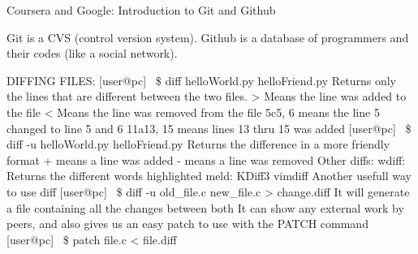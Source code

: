 \documentclass{article}
\begin{document}
Coursera and Google: Introduction to Git and Github

Git is a CVS (control version system).
Github is a database of programmers and their codes (like a social network).

DIFFING FILES:
[user@pc] ~\$ diff helloWorld.py helloFriend.py
	Returns only the lines that are different between the two files.
		> Means the line was added to the file
		< Means the line was removed from the file
		5c5, 6 means the line 5 changed to line 5 and 6
		11a13, 15 means lines 13 thru 15 was added
[user@pc] ~\$ diff -u helloWorld.py helloFriend.py
	Returns the difference in a more friendly format
		+ means a line was added
		- means a line was removed
Other diffs:
wdiff: Returns the different words highlighted
meld:
KDiff3
vimdiff
Another usefull way to use diff
[user@pc] ~\$ diff -u old\_file.c new\_file.c > change.diff
	It will generate a file containing all the changes between both
It can show any external work by peers, and also gives us an easy patch to use with the PATCH command
[user@pc] ~\$ patch file.c < file.diff
\end{document}
